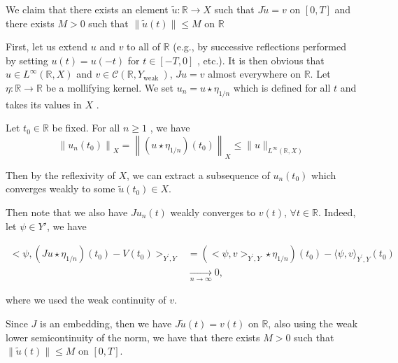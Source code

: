 \documentclass{beamer}
\begin{document}
\begin{frame}
  
 We claim that there exists an element $\tilde{u}: \mathbb{R}\rightarrow X$ such that $J\tilde{u}=v$ on $[0, T]$
and there exists $M> 0$ such that $\|\tilde{u}(t)\|\leq M$ on $\mathbb{R}$

First, let us extend  $u$ and $v$ to all of  $\mathbb{R}$  (e.g., by successive reflections performed
 by setting  $u(t)=u(-t)$  for  $t \in[-T, 0]$ , etc.). It is then obvious that  
$u \in L^{\infty}(\mathbb{R}, X) $ and 
$v\in \mathcal{C}\left(\mathbb{R}, Y_{\text {weak }}\right)$, $Ju=v$ almost everywhere on $\mathbb{R}$. Let  $\eta: \mathbb{R} \rightarrow \mathbb{R}$  be a mollifying kernel. We set  $u_{n}=u \star \eta_{1 / n}$  which is defined for all  $t$  and takes its values in  $X$ .

Let  $t_{0} \in \mathbb{R}$  be fixed. For all  $n \geq 1$ , we have
\begin{equation*}
  \left\|u_{n}\left(t_{0}\right)\right\|_{X}=\left\|\left(u \star \eta_{1 / n}\right)\left(t_{0}\right)\right\|_{X} \leq\|u\|_{L^{\infty}(\mathbb{R}, X)}
\end{equation*}

Then by the reflexivity of $X$, we can extract a subsequence of $u_n(t_0)$ which  converges
weakly to some $\tilde{u}(t_0) \in X$. 



\end{frame}


\begin{frame}
  Then note that we also have $Ju_n(t)$ weakly converges to $v(t)$, $\forall t\in\mathbb{R}$. Indeed, let $\psi \in Y'$, we have
 
    {\tiny

     \begin{equation*}
        \begin{aligned}
<\psi,\left(Ju \star \eta_{1 / n}\right)\left(t_{0}\right)-V\left(t_{0}\right)>_{Y^{\prime}, Y} & =\left(<\psi, v>_{Y^{\prime}, Y} \star \eta_{1 / n}\right)\left(t_{0}\right)-\langle\psi, v\rangle_{Y^{\prime}, Y}\left(t_{0}\right) \\
& \xrightarrow[n \rightarrow \infty]{ } 0,
\end{aligned}
  \end{equation*}

    
    }

where we used the weak continuity of $v$.

Since $J$ is an embedding, then we have $J\tilde{u}(t)=v(t)$ on $\mathbb{R}$, also using the weak lower semicontinuity
of the norm, we have that there exists $M> 0$ such that $\|\tilde{u}(t)\|\leq M$ on $[0, T]$.


\end{frame}
\end{document}
